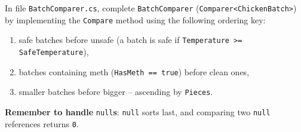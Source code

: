\documentclass[11pt,a4paper,addpoints]{exam}
\begin{document}
\begin{questions}
\question[1]
In file \texttt{BatchComparer.cs}, complete \texttt{BatchComparer} (\texttt{Comparer<ChickenBatch>}) by implementing the \texttt{Compare} method using the following ordering key:
    \begin{enumerate}
        \item safe batches before unsafe (a batch is safe if \texttt{Temperature >= SafeTemperature}),
        \item batches containing meth (\texttt{HasMeth == true}) before clean ones,
        \item smaller batches before bigger -- ascending by \texttt{Pieces}.
    \end{enumerate}
\textbf{Remember to handle} \texttt{null}\textbf{s}: \texttt{null} sorts last, and comparing two \texttt{null} references returns \texttt{0}.
\end{questions}
\end{document}
